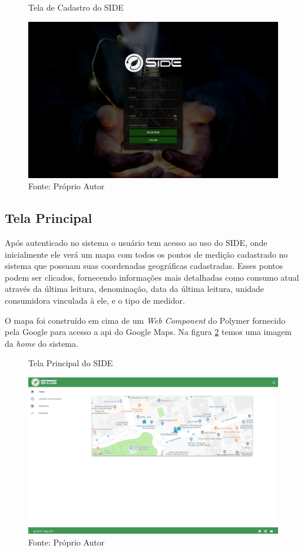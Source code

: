 \begin{figure}[H]
    \centering
    \caption{Tela de Cadastro do SIDE}
\includegraphics[width=0.65\linewidth]{imagens/side/side-cadastro.png}
    \caption*{Fonte: Próprio Autor}
    \label{fig:side-cadastro}
\end{figure}

\subsection{Tela Principal}

Após autenticado no sistema o usuário tem acesso ao uso do SIDE, onde inicialmente ele verá um mapa com todos os pontos de medição cadastrado no sistema que possuam suas coordenadas geográficas cadastradas. Esses pontos podem ser clicados, fornecendo informações mais detalhadas como consumo atual através da última leitura, denominação, data da última leitura, unidade consumidora vinculada à ele, e o tipo de medidor.

O mapa foi construído em cima de um \textit{Web Component} do Polymer fornecido pela Google para acesso a api do Google Maps. Na figura \ref{fig:side-home} temos uma imagem da \textit{home} do sistema.

\begin{figure}[H]
    \centering
    \caption{Tela Principal do SIDE}
\includegraphics[width=0.65\linewidth]{imagens/side/side-home.png}
    \caption*{Fonte: Próprio Autor}
    \label{fig:side-home}
\end{figure}



